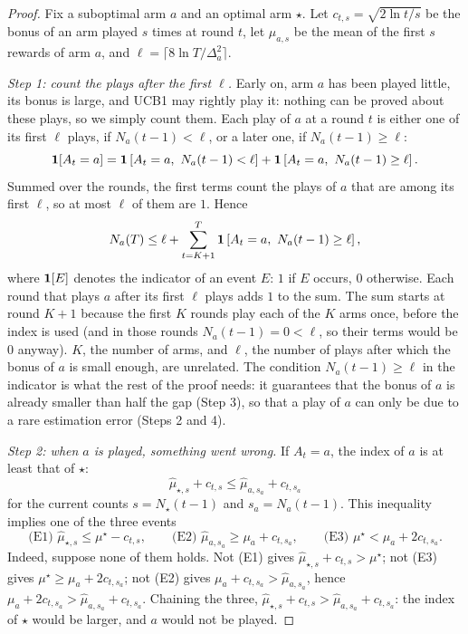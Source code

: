 \begin{proof}
  Fix a suboptimal arm $a$ and an optimal arm $\star$. Let $c_{t, s} =
  \sqrt{2 \ln t / s}$ be the bonus of an arm played $s$ times at round
  $t$, let $\hat\mu_{a, s}$ be the mean of the first $s$ rewards of arm
  $a$, and $\ell = \lceil 8 \ln T / \Delta_a^2 \rceil$.

  \emph{Step 1: count the plays after the first $\ell$.} Early on, arm $a$
  has been played little, its bonus is large, and UCB1 may rightly play it:
  nothing can be proved about these plays, so we simply count them. Each
  play of $a$ at a round $t$ is either one of its first $\ell$ plays, if
  $N_a(t-1) < \ell$, or a later one, if $N_a(t-1) \geq \ell$:
  \begin{equation*}
    \ind[A_t = a] = \ind\left[A_t = a,\ N_a(t-1) < \ell\right] +
    \ind\left[A_t = a,\ N_a(t-1) \geq \ell\right].
  \end{equation*}
  Summed over the rounds, the first terms count the plays of $a$ that are
  among its first $\ell$, so at most $\ell$ of them are $1$. Hence
  \begin{equation*}
    N_a(T) \leq \ell + \sum_{t = K+1}^{T} \mathbf{1}\left[A_t = a,\
    N_a(t-1) \geq \ell\right],
  \end{equation*}
  where $\mathbf{1}[E]$ denotes the indicator of an event $E$: $1$ if $E$ occurs,
  $0$ otherwise. Each round that plays $a$ after its first $\ell$ plays adds
  $1$ to the sum. The sum starts at round $K + 1$ because the first $K$
  rounds play each of the $K$ arms once, before the index is used (and in
  those rounds $N_a(t-1) = 0 < \ell$, so their terms would be $0$ anyway).
  $K$, the number of arms, and $\ell$, the number of plays after which the
  bonus of $a$ is small enough, are unrelated. The condition $N_a(t-1)
  \geq \ell$ in the indicator is what the rest of the proof needs: it
  guarantees that the bonus of $a$ is already smaller than half the gap
  (Step 3), so that a play of $a$ can only be due to a rare estimation
  error (Steps 2 and 4).

  \emph{Step 2: when $a$ is played, something went wrong.} If $A_t = a$,
  the index of $a$ is at least that of $\star$:
  \begin{equation*}
    \hat\mu_{\star, s} + c_{t, s} \leq \hat\mu_{a, s_a} + c_{t, s_a}
  \end{equation*}
  for the current counts $s = N_\star(t-1)$ and $s_a = N_a(t-1)$. This
  inequality implies one of the three events
  \begin{equation*}
    \text{(E1) } \hat\mu_{\star, s} \leq \mu^\star - c_{t, s}, \qquad
    \text{(E2) } \hat\mu_{a, s_a} \geq \mu_a + c_{t, s_a}, \qquad
    \text{(E3) } \mu^\star < \mu_a + 2 c_{t, s_a}.
  \end{equation*}
  Indeed, suppose none of them holds. Not (E1) gives $\hat\mu_{\star, s} +
  c_{t, s} > \mu^\star$; not (E3) gives $\mu^\star \geq \mu_a + 2 c_{t,
  s_a}$; not (E2) gives $\mu_a + c_{t, s_a} > \hat\mu_{a, s_a}$, hence $\mu_a
  + 2 c_{t, s_a} > \hat\mu_{a, s_a} + c_{t, s_a}$. Chaining the three,
  $\hat\mu_{\star, s} + c_{t, s} > \hat\mu_{a, s_a} + c_{t, s_a}$: the index
  of $\star$ would be larger, and $a$ would not be played.


\end{proof}
